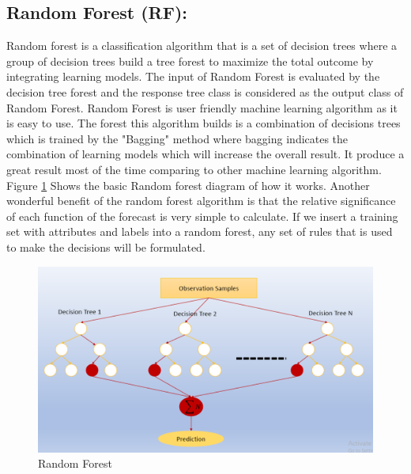 

\subsection{Random Forest (RF):}Random forest is a classification algorithm that is a set of decision trees where a group
of decision trees build a tree forest to maximize the total outcome by integrating learning models. The input of Random Forest is evaluated by the decision tree forest and the response tree class is considered as the output class of Random Forest. Random Forest is user friendly machine learning algorithm as it is easy to use. The forest this algorithm builds is a combination of decisions trees which is trained  by the
"Bagging" method where bagging indicates the combination of learning models which will increase the overall result.  It produce a great result most of the time comparing to other machine learning algorithm. Figure \ref{fig:RF} Shows the basic Random forest diagram of how it works. Another wonderful benefit of the random forest algorithm is that the relative
significance of each function of the forecast is very simple to calculate. If we insert a training set with attributes and labels into a random forest,
any set of rules that is used to make the decisions will be formulated. 
\begin{figure}[ht]
    \centering
    \includegraphics[scale=0.5]{Chap3/RF.PNG}
    \caption{Random Forest}
    \label{fig:RF}
\end{figure}

